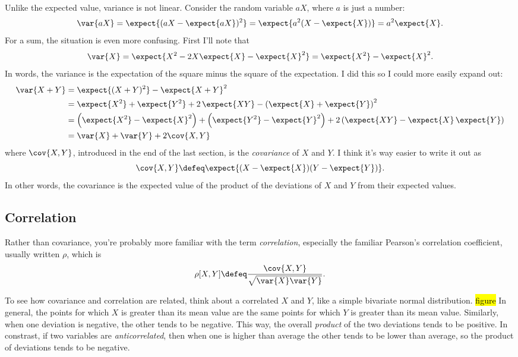 Unlike the expected value, variance is not linear. Consider the random variable $aX$,
where $a$ is just a number:
\begin{equation}
\var{aX} = \expect{(aX - \expect{aX})^2} = \expect{a^2(X - \expect{X})} = a^2 \expect{X}.
\end{equation}
For a sum, the situation is even more confusing. First I'll note that
\begin{equation}
\var{X} = \expect{X^2 - 2X \expect{X} - \expect{X}^2}
  = \expect{X^2} - \expect{X}^2.
\end{equation}
In words, the variance is the expectation of the square minus the square of
the expectation. I did this so I could more easily expand out:
\begin{align*}
\var{X + Y} &= \expect{(X+Y)^2} - \expect{X+Y}^2 \\
  &= \expect{X^2} + \expect{Y^2} + 2\, \expect{XY} - \left(\expect{X}+\expect{Y}\right)^2 \\
  &= \left(\expect{X^2} - \expect{X}^2\right) +
    \left(\expect{Y^2} - \expect{Y}^2\right) +
    2 \left(\expect{XY} - \expect{X} \, \expect{Y}\right) \\
  &= \var{X} + \var{Y} + 2 \cov{X, Y}
\end{align*}
where $\cov{X, Y}$, introduced in the end of the last section, is the
\emph{covariance} of $X$ and $Y$. I think it's way easier to write it out as
\begin{equation}
\cov{X, Y} \defeq \expect{(X - \expect{X})(Y - \expect{Y})}.
\end{equation}
In other words, the covariance is the expected value of the product of the
deviations of $X$ and $Y$ from their expected values.

\subsection{Correlation}

Rather than covariance, you're probably more
familiar with the term \emph{correlation}, especially the familiar Pearson's
correlation coefficient, usually written $\rho$, which is
\begin{equation}
\rho[X, Y] \defeq \frac{\cov{X, Y}}{\sqrt{\var{X} \var{Y}}}.
\end{equation}

To see how covariance and correlation are related, think about a correlated
$X$ and $Y$, like a simple bivariate normal distribution. \hl{figure} In
general, the points for which $X$ is greater than its mean value are the same
points for which $Y$ is greater than its mean value. Similarly, when one
deviation is negative, the other tends to be negative. This way, the overall
\emph{product} of the two deviations tends to be positive. In constrast, if
two variables are \emph{anticorrelated}, then when one is higher than average
the other tends to be lower than average, so the product of deviations tends
to be negative.

